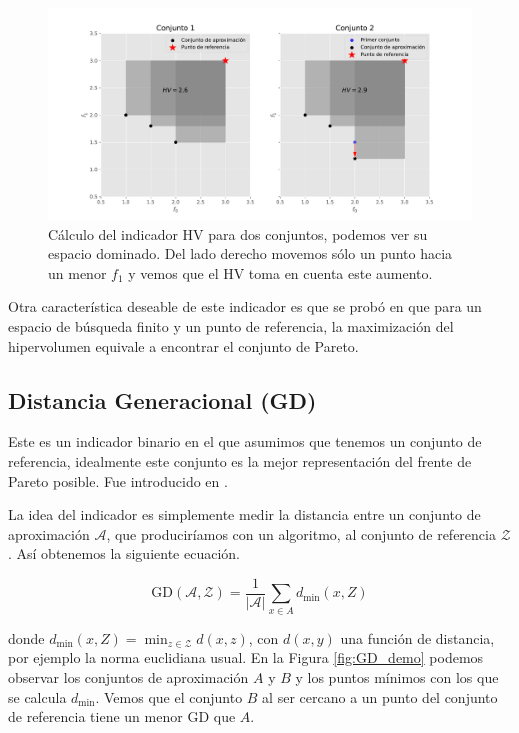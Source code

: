 \begin{figure}[H]
    \centering
    \includegraphics[scale=.6]{./Figuras/HV_demo.pdf} 
    \caption[Hipervolumen]{Cálculo del indicador HV para dos conjuntos, podemos ver su espacio dominado. Del lado derecho movemos sólo un punto hacia un menor $f_1$ y vemos que el HV toma en cuenta este aumento.}
    \label{fig:HV}
\end{figure}

Otra característica deseable de este indicador es que se probó en \cite{Measure_Pareto_Optima} que para un espacio de búsqueda finito y un punto de referencia, la maximización del hipervolumen equivale a encontrar el conjunto de Pareto. 

\subsection{Distancia Generacional (GD)} \label{sec:GD}
Este es un indicador binario en el que asumimos que tenemos un conjunto de referencia, idealmente este conjunto es la mejor representación del frente de Pareto posible. Fue introducido en \cite{GD}.

La idea del indicador es simplemente medir la distancia entre un conjunto de aproximación $\mathcal{A}$, que produciríamos con un algoritmo, al conjunto de referencia $\mathcal{Z}$. Así obtenemos la siguiente ecuación.

\begin{equation} \label{eq:GD}
    \text{GD} \left( \mathcal{A},\mathcal{Z} \right) = \frac{1}{|\mathcal{A}|} \sum_{x\in A} d_{\min}(x,Z)
\end{equation}

donde $d_{\min}(x,Z)=\min_{z \in \mathcal{Z}}{d(x,z)}$, con $d(x,y)$ una función de distancia, por ejemplo la norma euclidiana usual. En la Figura \ref{fig:GD_demo} podemos observar los conjuntos de aproximación $A$ y $B$ y los puntos mínimos con los que se calcula $d_{\min}$. Vemos que el conjunto $B$ al ser cercano a un punto del conjunto de referencia tiene un menor $\text{GD}$ que $A$.

